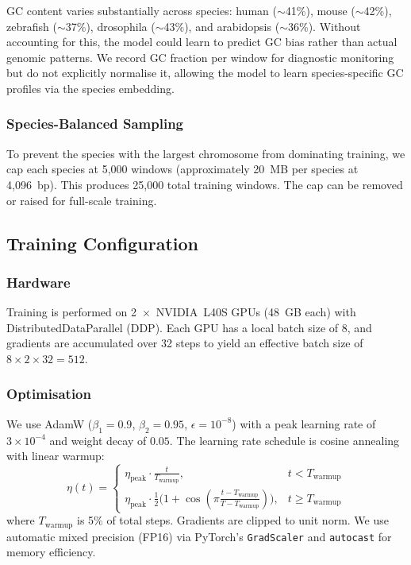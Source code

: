 \documentclass[11pt,a4paper,twoside]{article}
\begin{document}
GC content varies substantially across species: human ($\sim$41\%), mouse
($\sim$42\%), zebrafish ($\sim$37\%), drosophila ($\sim$43\%), and
arabidopsis ($\sim$36\%). Without accounting for this, the model could learn
to predict GC bias rather than actual genomic patterns. We record GC
fraction per window for diagnostic monitoring but do not explicitly
normalise it, allowing the model to learn species-specific GC profiles via
the species embedding.

\subsubsection*{Species-Balanced Sampling}

To prevent the species with the largest chromosome from dominating training,
we cap each species at 5,000 windows (approximately 20~MB per species at
4,096~bp). This produces 25,000 total training windows. The cap can be
removed or raised for full-scale training.

\subsection{Training Configuration}

\subsubsection*{Hardware}

Training is performed on 2~$\times$~NVIDIA~L40S GPUs (48~GB each) with
DistributedDataParallel (DDP). Each GPU has a local batch size of 8,
and gradients are accumulated over 32 steps to yield an effective batch size
of $8 \times 2 \times 32 = 512$.

\subsubsection*{Optimisation}

We use AdamW ($\beta_1=0.9$, $\beta_2=0.95$, $\epsilon=10^{-8}$) with a peak
learning rate of $3\times10^{-4}$ and weight decay of $0.05$. The learning
rate schedule is cosine annealing with linear warmup:
\begin{equation}
    \eta(t) =
    \begin{cases}
        \eta_{\text{peak}} \cdot \frac{t}{T_{\text{warmup}}},
        & t < T_{\text{warmup}} \\[4pt]
        \eta_{\text{peak}} \cdot \frac{1}{2}\bigl(1 +
        \cos(\pi \frac{t - T_{\text{warmup}}}{T - T_{\text{warmup}}})\bigr),
        & t \geq T_{\text{warmup}}
    \end{cases}
\end{equation}
where $T_{\text{warmup}}$ is 5\% of total steps. Gradients are clipped to
unit norm. We use automatic mixed precision (FP16) via PyTorch's
\texttt{GradScaler} and \texttt{autocast} for memory efficiency.
\end{document}
